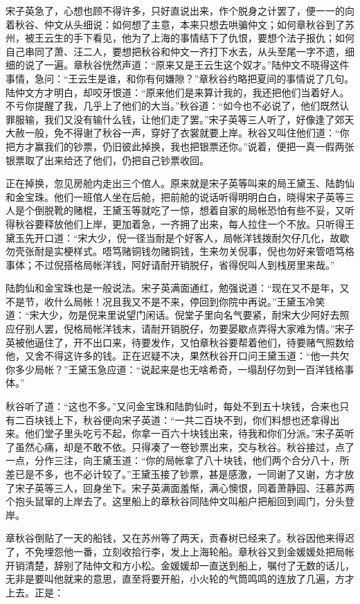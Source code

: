 \documentclass[12pt,UTF8]{ctexbook}
\begin{document}
{{{宋子英急了，心想也顾不得许多，只好直说出来，作个脱身之计罢了，便一一的向着秋谷、仲文从头细说：如何想了主意，本来只想去哄骗仲文；如何章秋谷到了苏州，被王云生的手下看见，他为了上海的事情结下了仇恨，要想个法子报仇；如何自己串同了萧、汪二人，要想把秋谷和仲文一齐打下水去，从头至尾一字不遗，细细的说了一遍。章秋谷恍然声道：“原来又是王云生这个奴才。”陆仲文不晓得这件事情，急问：“王云生是谁，和你有何嫌隙？”章秋谷约略把夏间的事情说了几句。陆仲文方才明白，却咬牙恨道：“原来他们是来算计我的，我还把他们当着好人。不亏你提醒了我，几乎上了他们的大当。”秋谷道：“如今也不必说了，他们既然认罪服输，我们又没有输什么钱，让他们走了罢。”宋子英等三人听了，好像逢了郊天大赦一般，免不得谢了秋谷一声，穿好了衣裳就要上岸。秋谷又叫住他们道：“你把方才赢我们的钞票，仍旧彼此掉换，我也把银票还你。”说着，便把一真一假两张银票取了出来给还了他们，仍把自己钞票收回。

正在掉换，忽见房舱内走出三个倌人。原来就是宋子英等叫来的局王黛玉、陆韵仙和金宝珠。他们一班倌人坐在后舱，把前舱的说话听得明明白白，晓得宋子英等三人是个倒脱靴的赌棍，王黛玉等就吃了一惊，想着自家的局帐恐怕有些不妥，又听得秋谷要释放他们上岸，更加着急，一齐拥了出来，每人拉住一个不放。只听得王黛玉先开口道：“宋大少，倪一径当耐是个好客人，局帐洋钱拨耐欠仔几化，故歇勿壳张耐是实梗样式。唔笃赌铜钱勿赌铜钱，生来勿关倪事，倪也勿好来管唔笃格事体；不过倪搭格局帐洋钱，阿好请耐开销脱仔，省得倪叫人到栈房里来哉。”

陆韵仙和金宝珠也是一般说法。宋子英满面通红，勉强说道：“现在又不是年，又不是节，收什么局帐！况且我又不是不来，停回到你院中再说。”王黛玉冷笑道：“宋大少，勿是倪来里说望门闲话。倪堂子里向名气要紧，耐宋大少阿好去照应仔别人罢，倪格局帐洋钱末，请耐开销脱仔，勿要晏歇点弄得大家难为情。”宋子英被他逼住了，开不出口来，待要发作，又怕章秋谷要帮着他们，待要赌气照数给他，又舍不得这许多的钱。正在迟疑不决，果然秋谷开口问王黛玉道：“他一共欠你多少局帐？”王黛玉急应道：“说起来是也无啥希奇，一塌刮仔勿到一百洋钱格事体。”

秋谷听了道：“这也不多。”又问金宝珠和陆韵仙时，每处不到五十块钱，合来也只有二百块钱上下，秋谷便向宋子英道：“一共二百块不到，你们料想也还拿得出来。他们堂子里头吃亏不起，你拿一百六十块钱出来，待我和你们分派。”宋子英听了虽然心痛，却是不敢不依。只得凑了一卷钞票出来，交与秋谷。秋谷接过，点了一点，分作三注，向王黛玉道：“你的局帐拿了八十块钱，他们两个合分八十，所差已是不多，也不必计较了。”王黛玉接了钞票，甚是感激，一同谢了又谢，方才放了宋子英等三人，回身坐下。宋子英满面羞惭，满心懊恨，同着萧静园、汪慕苏两个抱头鼠窜的上岸去了。这里船上的章秋谷同陆仲文叫船户把船回到阊门，分头登岸。

章秋谷倒贴了一天的船钱，又在苏州等了两天，贡春树已经来了。秋谷因他来得迟了，不免埋怨他一番，立刻收拾行李，发上上海轮船。章秋谷又到金媛媛处把局帐开销清楚，辞别了陆仲文和方小松。金媛媛却一直送到船上，嘱付了无数的话儿，无非是要叫他就来的意思，直至将要开船，小火轮的气筒鸣鸣的连放了几遍，方才上去。正是：

}}}
\end{document}
